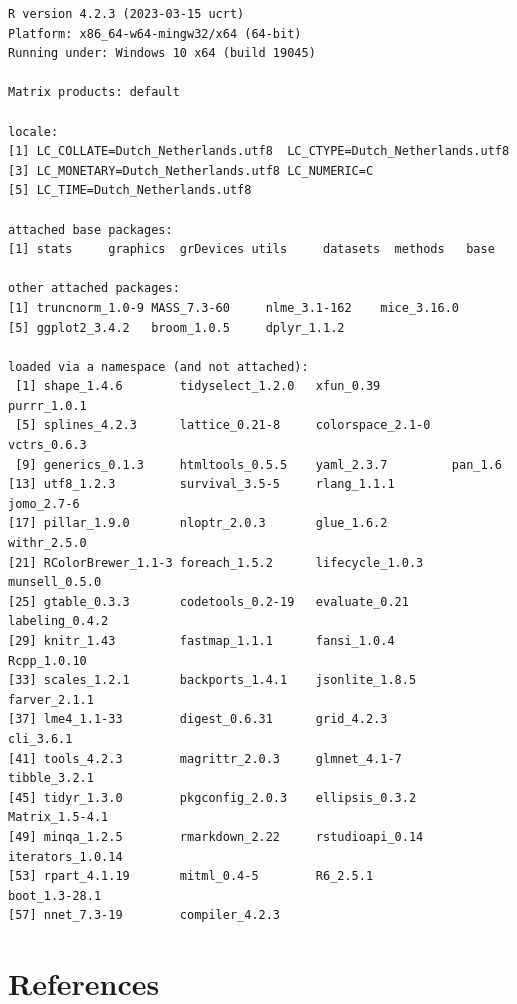\documentclass[
  letterpaper,
  DIV=11,
  numbers=noendperiod]{scrreprt}
\begin{document}
\begin{verbatim}
R version 4.2.3 (2023-03-15 ucrt)
Platform: x86_64-w64-mingw32/x64 (64-bit)
Running under: Windows 10 x64 (build 19045)

Matrix products: default

locale:
[1] LC_COLLATE=Dutch_Netherlands.utf8  LC_CTYPE=Dutch_Netherlands.utf8   
[3] LC_MONETARY=Dutch_Netherlands.utf8 LC_NUMERIC=C                      
[5] LC_TIME=Dutch_Netherlands.utf8    

attached base packages:
[1] stats     graphics  grDevices utils     datasets  methods   base     

other attached packages:
[1] truncnorm_1.0-9 MASS_7.3-60     nlme_3.1-162    mice_3.16.0    
[5] ggplot2_3.4.2   broom_1.0.5     dplyr_1.1.2    

loaded via a namespace (and not attached):
 [1] shape_1.4.6        tidyselect_1.2.0   xfun_0.39          purrr_1.0.1       
 [5] splines_4.2.3      lattice_0.21-8     colorspace_2.1-0   vctrs_0.6.3       
 [9] generics_0.1.3     htmltools_0.5.5    yaml_2.3.7         pan_1.6           
[13] utf8_1.2.3         survival_3.5-5     rlang_1.1.1        jomo_2.7-6        
[17] pillar_1.9.0       nloptr_2.0.3       glue_1.6.2         withr_2.5.0       
[21] RColorBrewer_1.1-3 foreach_1.5.2      lifecycle_1.0.3    munsell_0.5.0     
[25] gtable_0.3.3       codetools_0.2-19   evaluate_0.21      labeling_0.4.2    
[29] knitr_1.43         fastmap_1.1.1      fansi_1.0.4        Rcpp_1.0.10       
[33] scales_1.2.1       backports_1.4.1    jsonlite_1.8.5     farver_2.1.1      
[37] lme4_1.1-33        digest_0.6.31      grid_4.2.3         cli_3.6.1         
[41] tools_4.2.3        magrittr_2.0.3     glmnet_4.1-7       tibble_3.2.1      
[45] tidyr_1.3.0        pkgconfig_2.0.3    ellipsis_0.3.2     Matrix_1.5-4.1    
[49] minqa_1.2.5        rmarkdown_2.22     rstudioapi_0.14    iterators_1.0.14  
[53] rpart_4.1.19       mitml_0.4-5        R6_2.5.1           boot_1.3-28.1     
[57] nnet_7.3-19        compiler_4.2.3    
\end{verbatim}

\hypertarget{references-2}{%
\section*{References}\label{references-2}}


\end{document}
